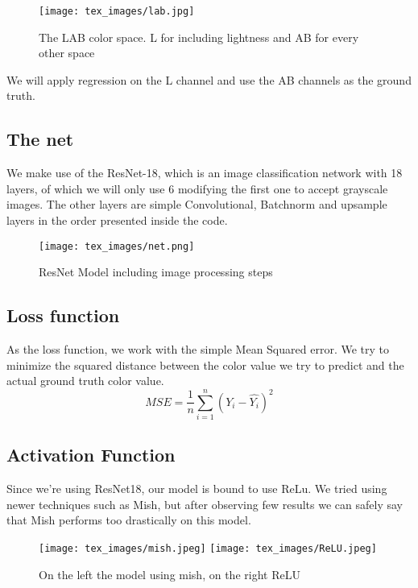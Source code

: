 \documentclass{article}
\begin{document}
\begin{figure}[htp]

    \centering
    \texttt{[image: tex\_images/lab.jpg]}\hfill

    
    \caption{The LAB color space. L for including lightness and 
    AB for every other space}
    \label{fig:figure 1.}
    
    \end{figure}

We will apply regression on the L channel and use the AB channels as the 
ground truth. 

\subsection{The net}
We make use of the ResNet-18, which is an image classification network with 18
layers, of which we will only use 6 modifying the first one to accept grayscale
images. The other layers are simple Convolutional, Batchnorm and upsample 
layers in the order presented inside the code. 

\begin{figure}[htp]

    \centering
    \texttt{[image: tex\_images/net.png]}\hfill

    
    \caption{ResNet Model including image processing steps}
    \label{fig:figure 1.}
    
    \end{figure}


\subsection{Loss function}
As the loss function, we work with the simple Mean Squared error. We try to 
minimize the squared distance between the color value we try to predict and the 
actual ground truth color value. 
$$ MSE = \frac{1}{n} \sum^{n}_{i=1}(Y_i - \hat{Y_i})^2$$ 

\subsection{Activation Function}
Since we're using ResNet18, our model is bound to use ReLu. We tried using 
newer techniques such as Mish, but after observing few results we can safely 
say that Mish performs too drastically on this model. 
\begin{figure}[htp]

    \centering
    \texttt{[image: tex\_images/mish.jpeg]}\hfill
    \texttt{[image: tex\_images/ReLU.jpeg]}\hfill
    
    \caption{On the left the model using mish, on the right ReLU}
    \label{fig:figure 1.}
    
    \end{figure}
\end{document}
